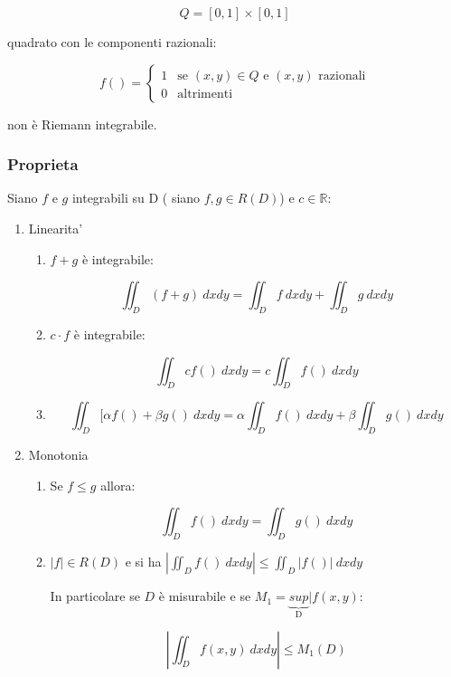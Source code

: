 \documentclass[../appunti-analisi.tex]{subfiles}
\begin{document}
\[
    Q = [0,1] \times [0,1]
\]

quadrato con le componenti razionali:

\[
    f() = \begin{cases}
        1 & \text{se $(x,y) \in Q$ e $(x,y)$ razionali} \\
         0 & \text{altrimenti}
    \end{cases}
\]

non è Riemann integrabile.


\subsubsection{Proprieta}

Siano $f$ e $g$ integrabili su D ( siano $f,g \in R(D)$) e $c \in \mathbb{R}$:

\begin{enumerate}
    \item Linearita'
        \begin{enumerate}
            \item $f+g$ è integrabile:

                \[
                    \iint_D {(f+g)} \: dx d y  = \iint_D {f} \: dx d y + \iint_D {g} \: dx d y 
                \]
            \item $c\cdot f$ è integrabile:

                \[
                    \iint_D {c f()} \: dx  d y = c \iint_D {f()} \: dx  d y 
                \]

            \item \[
                \iint_D {[\alpha f() + \beta g() } \: dx d y = \alpha \iint_D {f()} \: dx d y + \beta \iint_D {g()} \: dx d y 
            \]
        \end{enumerate}

    \item Monotonia
        \begin{enumerate}
            \item Se $f \le g$ allora:

                \[
                    \iint_D {f()} \: dx d y = \iint_D {g()} \: dx d y 
                \]
            \item $|f| \in R(D)$ e si ha $\left|\iint_D {f()} \: dx d y \right| \le \iint_D {\left|f()\right|} \: dx d y  $

                In particolare se $D$ è misurabile e se $M_1= \underbrace{sup}_\text{D} | f(x,y)$:

                \[
                    \left|\iint_D {f(x,y)} \: dx d y\right| \le M_1(D)
                \]

        \end{enumerate}
        
\end{enumerate}
\end{document}
